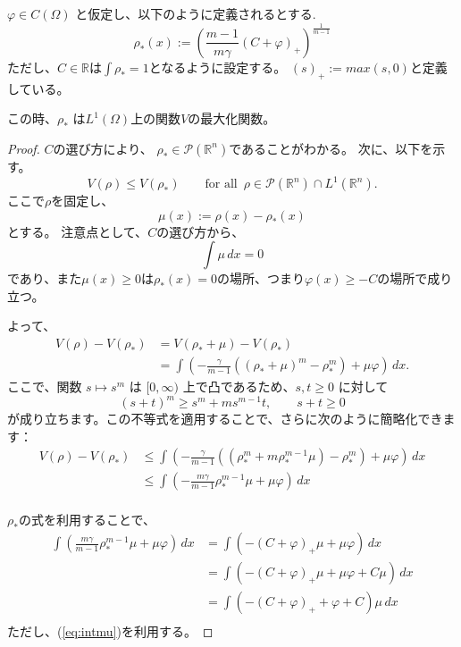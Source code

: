 \begin{lem}
    \label{lem:rho_opt}
    $\varphi \in C(\Omega)$ と仮定し、以下のように定義されるとする.
    $$
        \rho_*(x) := \left( \frac{m-1}{m\gamma}(C + \varphi)_+ \right)^{\frac{1}{m-1}} 
    $$
    ただし、$C \in \mathbb{R}$は$\int \rho_* = 1$となるように設定する。
    $(s)_+ := max(s, 0)$と定義している。

    この時、$\rho_*$ は$L^1(\Omega)$上の関数$V$の最大化関数。
\end{lem}
\begin{proof}
    $C$の選び方により、 $\rho_* \in \mathcal{P}(\mathbb{R}^n)$であることがわかる。
    次に、以下を示す。
    $$
    V(\rho) \leq V(\rho_*) \qquad \text{for all } \, \rho \in \mathcal{P}(\mathbb{R}^n) \cap L^1(\mathbb{R}^n).
    $$
    ここで$\rho$を固定し、 
    $$
    \mu(x) := \rho(x) - \rho_*(x)
    $$
    とする。
    注意点として、$C$の選び方から、
    \begin{equation}
        \label{eq:intmu}
        \int \mu \, dx = 0
    \end{equation}
    であり、また$\mu(x) \geq 0$は$\rho_*(x) = 0$の場所、つまり$\varphi(x) \geq -C$の場所で成り立つ。

    よって、
    \begin{align*}
        V(\rho) - V(\rho_*) &= V(\rho_* + \mu) - V(\rho_*)\\
                            &= \int \left(- \frac{\gamma}{m-1} ((\rho_* + \mu)^m - \rho_*^{m}) + \mu \varphi \right) \, dx.
    \end{align*}
    ここで、関数 $s \mapsto s^m$ は $[0, \infty)$ 上で凸であるため、$s, t \geq 0$ に対して 
    $$
        (s + t)^m \geq s^m + ms^{m-1}t, \qquad s + t \geq 0
    $$ 
    が成り立ちます。この不等式を適用することで、さらに次のように簡略化できます：
    \begin{align*}
        V(\rho) - V(\rho_*) &\leq \int \left(- \frac{\gamma}{m-1} ((\rho_*^m + m \rho_*^{m-1} \mu) - \rho_*^{m}) + \mu \varphi \right) \, dx\\
                            &\leq \int \left(- \frac{m\gamma}{m-1} \rho_*^{m-1}\mu + \mu\varphi\right) \, dx\\
    \end{align*}

    $\rho_*$の式を利用することで、
    \begin{align*}
        \int \left(\frac{m\gamma}{m-1} \rho_*^{m-1}\mu + \mu\varphi\right) \, dx &= \int \left(-(C + \varphi)_+ \mu + \mu\varphi\right) \, dx \\
                                                                        &= \int \left(-(C + \varphi)_+ \mu + \mu \varphi + C \mu\right) \, dx \\
                                                                        &= \int \left(-(C + \varphi)_+ + \varphi + C\right)\mu \, dx \\  
    \end{align*}
    ただし、(\ref{eq:intmu})を利用する。


\end{proof}
